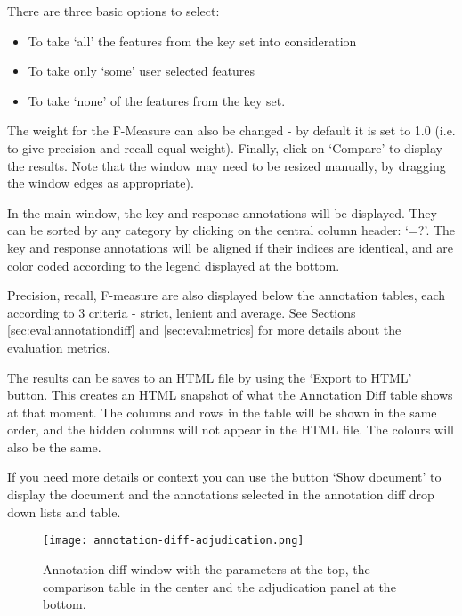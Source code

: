 There are three basic options to select:
\begin{itemize}
\item
To take `all' the features from the key set into consideration
\item
To take only `some' user selected features
\item
To take `none' of the features from the key set.
\end{itemize}

The weight for the F-Measure can also be changed - by default it is set to
1.0 (i.e. to give precision and recall equal weight). Finally, click on
`Compare' to display the results. Note that the window may need to be
resized manually, by dragging the window edges as appropriate).

In the main window, the key and response annotations will be
displayed. They can be sorted by any category by clicking on the
central column header: `=?'. The key and response annotations will be
aligned if their indices are identical, and are color coded
according to the legend displayed at the bottom.

Precision, recall, F-measure are also displayed below the annotation tables,
each according to 3 criteria - strict, lenient and average. See Sections
\ref{sec:eval:annotationdiff} and \ref{sec:eval:metrics} for more
details about the evaluation metrics.

The results can be saves to an HTML file by using the `Export to
HTML' button. This creates an HTML snapshot of what the Annotation Diff
table shows at that moment. The columns and rows in the table will
be shown in the same order, and the hidden columns will not appear in
the HTML file. The colours will also be the same.

If you need more details or context you can use the button `Show document'
to display the document and the annotations selected in the annotation diff
drop down lists and table.


\begin{figure}[htbp]
\begin{center}
\texttt{[image: annotation-diff-adjudication.png]}
\end{center}
\caption{Annotation diff window with the parameters at the top,
the comparison table in the center and the adjudication panel at the
bottom.}
\label{fig:annotdiff2}
\end{figure}

